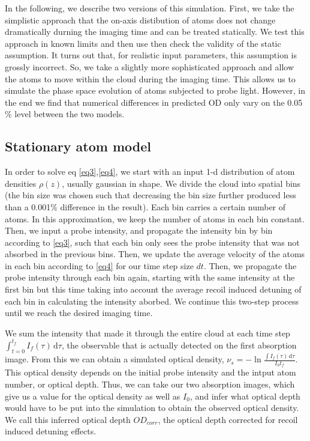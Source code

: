\documentclass[12pt]{iopart}
\begin{document}
\par In the following, we describe two versions of this simulation. First, we take the simplistic approach that the on-axis distibution of atoms does not change dramatically durning the imaging time and can be treated statically. We test this approach in known limits and then use then check the validity of the static assumption. It turns out that, for realistic input parameters, this assumption is grossly incorrect. So, we take a slightly more sophisticated approach and allow the atoms to move within the cloud during the imaging time. This allows us to simulate the phase space evolution of atoms subjected to probe light. However,   
in the end we find that numerical differences in predicted OD only vary on the 0.05$\%$ level between the two models. 


\subsection{Stationary atom model}
In order to solve eq \ref{eq3},\ref{eq4}, we start with an input 1-d distribution of atom densities $\rho(z)$, usually gaussian in shape. We divide the cloud into spatial bins (the bin size was chosen such that decreasing the bin size further produced less than a 0.001$\%$ difference in the result).   Each bin carries a certain number of atoms. In this approximation, we keep the number of atoms in each bin constant. Then, we input a probe intensity, and propagate the intensity bin by bin according to \ref{eq3}, such that each bin only sees the probe intensity that was not absorbed in the previous bins. Then, we update the average velocity of the atoms in each bin according to \ref{eq4} for our time step size $dt$.  Then, we propagate the probe intensity through each bin again, starting with the same intensity at the first bin but this time taking into account the average recoil induced detuning of each bin in calculating the intensity aborbed. We continue this two-step process until we reach the desired imaging time.
\par We sum the intensity that made it through the entire cloud at each time step $\int_{t=0}^{t_f} I_f (\tau)\,\mathrm{d}\tau$, the observable that is actually detected on the first absorption image.  From this we can obtain a simulated optical density, $\nu _s = -\ln{\frac{\int I_f (\tau)\,\mathrm{d}\tau}{I_0 t_f}}$. This optical density depends on the initial probe intensity and the intput atom number, or optical depth. Thus, we can take our two absorption images, which give us a value for the optical density as well as $I_0$, and infer what optical depth would have to be put into the simulation to obtain the observed optical density. We call this inferred optical depth $OD_{corr}$, the optical depth corrected for recoil induced detuning effects.  
\end{document}
